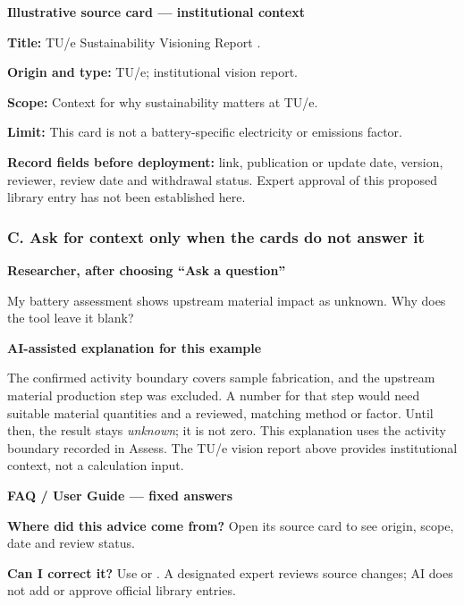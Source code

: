 \begin{learnscreen}
\textbf{Illustrative source card --- institutional context}\par
\textbf{Title:} TU/e Sustainability Visioning Report \citep{tue_sustainability_2021}.\par
\textbf{Origin and type:} TU/e; institutional vision report.\par
\textbf{Scope:} Context for why sustainability matters at TU/e.\par
\textbf{Limit:} This card is not a battery-specific electricity or emissions factor.\par
\textbf{Record fields before deployment:} link, publication or update date, version, reviewer, review date and withdrawal status. Expert approval of this proposed library entry has not been established here.\par\medskip
{}\quad
{}\quad
{}
\end{learnscreen}

\subsubsection*{C. Ask for context only when the cards do not answer it}
\begin{flushright}\begin{learnuser}
\textbf{Researcher, after choosing ``Ask a question''}\par
My battery assessment shows upstream material impact as unknown. Why does the tool leave it blank?
\end{learnuser}\end{flushright}

\begin{learnscreen}
\textbf{AI-assisted explanation for this example}\par
The confirmed activity boundary covers sample fabrication, and the upstream material production step was excluded. A number for that step would need suitable material quantities and a reviewed, matching method or factor. Until then, the result stays \emph{unknown}; it is not zero. This explanation uses the activity boundary recorded in Assess. The TU/e vision report above provides institutional context, not a calculation input.\par\medskip
{}\quad
{}\quad
{}
\end{learnscreen}

\begin{learnscreen}
\textbf{FAQ / User Guide --- fixed answers}\par
\textbf{Where did this advice come from?} Open its source card to see origin, scope, date and review status.\par
\textbf{Can I correct it?} Use  or . A designated expert reviews source changes; AI does not add or approve official library entries.\par
{}\quad
{}\quad
{}
\end{learnscreen}
